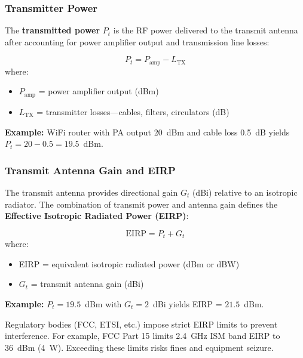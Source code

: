 \subsubsection{Transmitter Power}

The \textbf{transmitted power} $P_t$ is the RF power delivered to the transmit antenna after accounting for power amplifier output and transmission line losses:

\begin{equation}
\label{eq:tx_power}
P_t = P_{\text{amp}} - L_{\text{TX}}
\end{equation}
where:
\begin{itemize}
\item $P_{\text{amp}}$ = power amplifier output (dBm)
\item $L_{\text{TX}}$ = transmitter losses---cables, filters, circulators (dB)
\end{itemize}

\textbf{Example:} WiFi router with PA output 20~dBm and cable loss 0.5~dB yields $P_t = 20 - 0.5 = 19.5$~dBm.

\subsubsection{Transmit Antenna Gain and EIRP}

The transmit antenna provides directional gain $G_t$ (dBi) relative to an isotropic radiator. The combination of transmit power and antenna gain defines the \textbf{Effective Isotropic Radiated Power (EIRP)}:

\begin{equation}
\label{eq:eirp}
\text{EIRP} = P_t + G_t
\end{equation}
where:
\begin{itemize}
\item EIRP = equivalent isotropic radiated power (dBm or dBW)
\item $G_t$ = transmit antenna gain (dBi)
\end{itemize}

\textbf{Example:} $P_t = 19.5$~dBm with $G_t = 2$~dBi yields EIRP = $21.5$~dBm.

\begin{warningbox}
Regulatory bodies (FCC, ETSI, etc.) impose strict EIRP limits to prevent interference. For example, FCC Part 15 limits 2.4~GHz ISM band EIRP to 36~dBm (4~W). Exceeding these limits risks fines and equipment seizure.
\end{warningbox}

